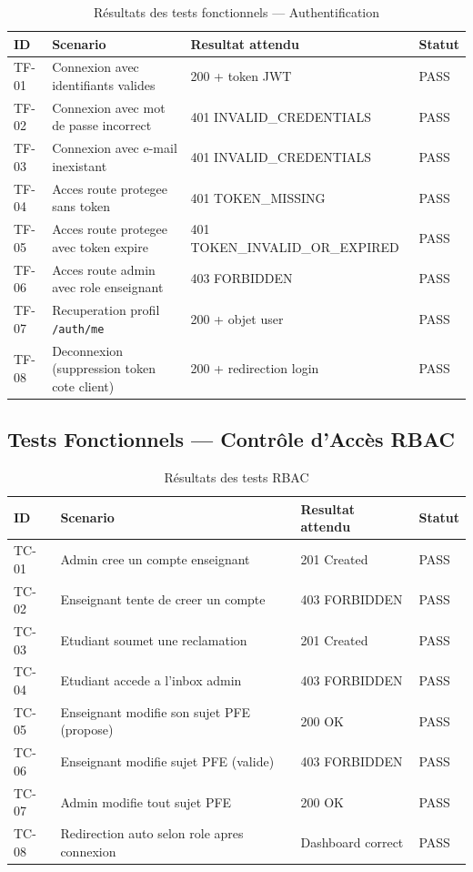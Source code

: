 \documentclass[12pt,a4paper,oneside]{report}
\begin{document}
\begin{table}[H]
\centering
\caption{Résultats des tests fonctionnels — Authentification}
\begin{tabularx}{\linewidth}{@{}lLll@{}}
\toprule
\textbf{ID} & \textbf{Scenario} & \textbf{Resultat attendu} & \textbf{Statut} \\
\midrule
TF-01 & Connexion avec identifiants valides          & 200 + token JWT              & PASS \\
TF-02 & Connexion avec mot de passe incorrect        & 401 INVALID\_CREDENTIALS     & PASS \\
TF-03 & Connexion avec e-mail inexistant             & 401 INVALID\_CREDENTIALS     & PASS \\
TF-04 & Acces route protegee sans token              & 401 TOKEN\_MISSING           & PASS \\
TF-05 & Acces route protegee avec token expire       & 401 TOKEN\_INVALID\_OR\_EXPIRED & PASS \\
TF-06 & Acces route admin avec role enseignant       & 403 FORBIDDEN                & PASS \\
TF-07 & Recuperation profil \texttt{/auth/me}        & 200 + objet user             & PASS \\
TF-08 & Deconnexion (suppression token cote client)  & 200 + redirection login      & PASS \\
\bottomrule
\end{tabularx}
\end{table}

\subsection{Tests Fonctionnels — Contrôle d'Accès RBAC}

\begin{table}[H]
\centering
\caption{Résultats des tests RBAC}
\begin{tabularx}{\linewidth}{@{}lLll@{}}
\toprule
\textbf{ID} & \textbf{Scenario} & \textbf{Resultat attendu} & \textbf{Statut} \\
\midrule
TC-01 & Admin cree un compte enseignant              & 201 Created         & PASS \\
TC-02 & Enseignant tente de creer un compte          & 403 FORBIDDEN       & PASS \\
TC-03 & Etudiant soumet une reclamation              & 201 Created         & PASS \\
TC-04 & Etudiant accede a l'inbox admin              & 403 FORBIDDEN       & PASS \\
TC-05 & Enseignant modifie son sujet PFE (propose)   & 200 OK              & PASS \\
TC-06 & Enseignant modifie sujet PFE (valide)        & 403 FORBIDDEN       & PASS \\
TC-07 & Admin modifie tout sujet PFE                 & 200 OK              & PASS \\
TC-08 & Redirection auto selon role apres connexion  & Dashboard correct   & PASS \\
\bottomrule
\end{tabularx}
\end{table}
\end{document}
